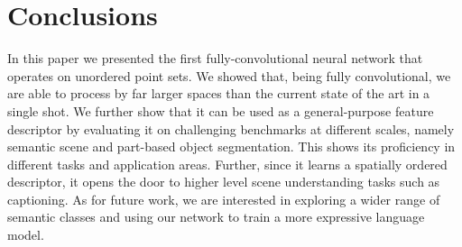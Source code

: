\documentclass[runningheads]{llncs}
\begin{document}
\section{Conclusions}

In this paper we presented the first fully-convolutional neural network that operates on unordered point sets. We showed that, being fully convolutional, we are able to process by far larger spaces than the current state of the art in a single shot. We further show that it can be used as a general-purpose feature descriptor by evaluating it on challenging benchmarks at different scales, namely semantic scene and part-based object segmentation. This shows its proficiency in different tasks and application areas. Further, since it learns a spatially ordered descriptor, it opens the door to higher level scene understanding tasks such as captioning. As for future work, we are interested in exploring a wider range of semantic classes and using our network to train a more expressive language model.



\end{document}
